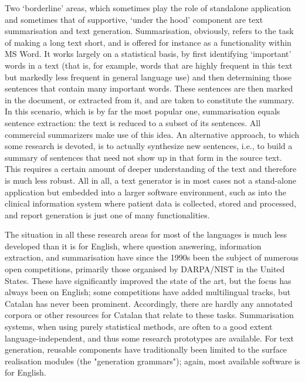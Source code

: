 \begin{multicols}{2}
Two ‘borderline’ areas, which sometimes play the role of standalone application and sometimes that of supportive, ‘under the hood’ component are text summarisation and text generation. Summarisation, obviously, refers to the task of making a long text short, and is offered for instance as a functionality within MS Word. It works largely on a statistical basis, by first identifying ‘important’ words in a text (that is, for example, words that are highly frequent in this text but markedly less frequent in general language use) and then determining those sentences that contain many important words. These sentences are then marked in the document, or extracted from it, and are taken to constitute the summary. In this scenario, which is by far the most popular one, summarisation equals sentence extraction: the text is reduced to a subset of its sentences. All commercial summarizers make use of this idea. An alternative approach, to which some research is devoted, is to actually synthesize new sentences, i.e., to build a summary of sentences that need not show up in that form in the source text. This requires a certain amount of deeper understanding of the text and therefore is much less robust. All in all, a text generator is in most cases not a stand-alone application but embedded into a larger software environment, such as into the clinical information system where patient data is collected, stored and processed, and report generation is just one of many functionalities.


The situation in all these research areas for most of the languages is much less developed than it is for English, where question answering, information extraction, and summarisation have since the 1990s been the subject of numerous open competitions, primarily those organised by DARPA/NIST in the United States. These have significantly improved the state of the art, but the focus has always been on English; some competitions have added multilingual tracks, but Catalan has never been prominent. Accordingly, there are hardly any annotated corpora or other resources for Catalan that relate to these tasks. Summarisation systems, when using purely statistical methods, are often to a good extent language-independent, and thus some research prototypes are available. For text generation, reusable components have traditionally been limited to the surface realisation modules (the "generation grammars"); again, most available software is for English.


\end{multicols}
